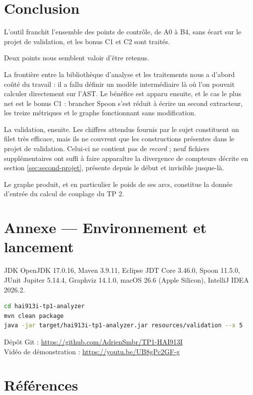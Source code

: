 \documentclass[11pt,a4paper]{article}
\begin{document}
\section{Conclusion}

L'outil franchit l'ensemble des points de contrôle, de A0 à B4, sans écart sur le projet de validation, et les bonus C1 et C2 sont traités.

Deux points nous semblent valoir d'être retenus.

La frontière entre la bibliothèque d'analyse et les traitements nous a d'abord coûté du travail : il a fallu définir un modèle intermédiaire là où l'on pouvait calculer directement sur l'AST. Le bénéfice est apparu ensuite, et le cas le plus net est le bonus C1 : brancher Spoon s'est réduit à écrire un second extracteur, les treize métriques et le graphe fonctionnant sans modification.

La validation, ensuite. Les chiffres attendus fournis par le sujet constituent un filet très efficace, mais ils ne couvrent que les constructions présentes dans le projet de validation. Celui-ci ne contient pas de \textit{record} ; neuf fichiers supplémentaires ont suffi à faire apparaître la divergence de compteurs décrite en section \ref{sec:second-projet}, présente depuis le début et invisible jusque-là.

Le graphe produit, et en particulier le poids de ses arcs, constitue la donnée d'entrée du calcul de couplage du TP 2.

\section*{Annexe --- Environnement et lancement}

JDK OpenJDK 17.0.16, Maven 3.9.11, Eclipse JDT Core 3.46.0, Spoon 11.5.0, JUnit Jupiter 5.14.4, Graphviz 14.1.0, macOS 26.6 (Apple Silicon), IntelliJ IDEA 2026.2.

\begin{lstlisting}[language=bash]
cd hai913i-tp1-analyzer
mvn clean package
java -jar target/hai913i-tp1-analyzer.jar resources/validation --x 5
\end{lstlisting}

Dépôt Git : \url{https://github.com/AdrienSmbr/TP1-HAI913I} \\
Vidéo de démonstration : \url{https://youtu.be/UB8gPc2GF-g}

\section*{Références}
\end{document}

